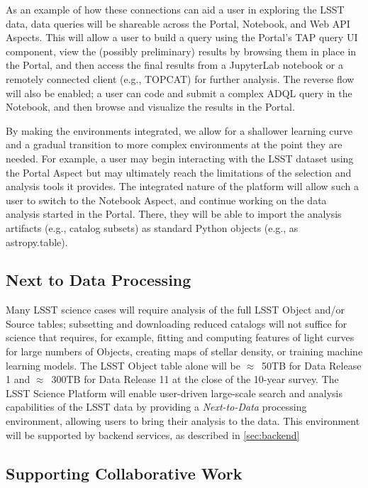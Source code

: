 As an example of how these connections can aid a user in exploring the LSST data, data queries will be shareable across the Portal, Notebook, and Web API Aspects.
This will allow a user to build a query using the Portal's TAP query UI component, view the (possibly preliminary) results by browsing them in place in the Portal, and then access the final results from a JupyterLab notebook or a remotely connected client (e.g., TOPCAT) for further analysis.
The reverse flow will also be enabled; a user can code and submit a complex ADQL query in the Notebook, and then browse and visualize the results in the Portal.

By making the environments integrated, we allow for a shallower learning curve and a gradual transition to more complex environments at the point they are needed.
For example, a user may begin interacting with the LSST dataset using the Portal Aspect but may ultimately reach the limitations of the selection and analysis tools it provides.
The integrated nature of the platform will allow such a user to switch to the Notebook Aspect, and continue working on the data analysis started in the Portal.
There, they will be able to import the analysis artifacts (e.g., catalog subsets) as standard Python objects (e.g., as astropy.table).

\subsection{Next to Data Processing\label{sec:n2d}}
Many LSST science cases will require analysis of the full LSST Object and/or Source tables; subsetting and downloading reduced catalogs will not suffice for science that requires, for example, fitting and computing features of light curves for large numbers of Objects, creating maps of stellar density, or training machine learning models.
The LSST Object table alone will be $\approx$~50TB for Data Release 1 and $\approx$~300TB for Data Release 11 at the close of the 10-year survey.
The LSST Science Platform will enable user-driven large-scale search and analysis capabilities of the LSST data by providing a \emph{Next-to-Data} processing environment, allowing users to bring their analysis to the data.
This environment will be supported by backend services, as described in \ref{sec:backend}

\subsection{Supporting Collaborative Work\label{sec:collab}}

